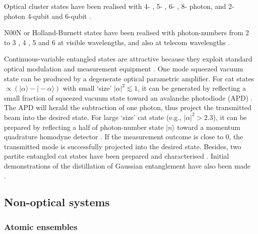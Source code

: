 \documentclass[aps, rmp, twocolumn, amsmath, amssymb, nofootinbib, superscriptaddress, longbibliography, floatfix, table-of-contents, eqsecnum]{revtex4-1}
\newcommand{\ket}[1]{|#1\rangle}
\begin{document}
Optical cluster states have been realised with 4- \cite{walther2005experimental}, 5- \cite{lu2008experimental}, 6- \cite{lu2007experimental}, 8- \cite{yao2012experimental} photon, and 2-photon 4-qubit \cite{chen2007experimental} and 6-qubit \cite{ceccarelli2009experimental}.

N00N or Holland-Burnett states have been realised with photon-numbers from 2 \cite{edamatsu2002measurement} to 3 \cite{mitchell2004super}, 4 \cite{walther2004broglie, nagata2007beating, matthews2011heralding}, 5 \cite{afek2010high} and 6 \cite{xiang2012optimal} at visible wavelengths, and also at telecom wavelengths \cite{yabuno2012four, bisht2015spectral, jin2016detection}.

Continuous-variable entangled states are attractive because they exploit standard optical modulation and measurement equipment \cite{ralph2009bright}. One mode squeezed vacuum state can be produced by a degenerate optical parametric amplifier. For cat states \mbox{$\propto(\ket{\alpha} - \ket{-\alpha})$} with small `size' \mbox{$|\alpha|^2 \lesssim 1$}, it can be generated by reflecting a small fraction of squeezed vacuum state toward an avalanche photodiode (APD) \cite{neergaard2006generation, ourjoumtsev2006generating, wakui2007photon}. The APD will herald the subtraction of one photon, thus project the transmitted beam into the desired state. For large `size' cat state (e.g., \mbox{$|\alpha|^2 > 2.3$}), it can be prepared by reflecting a half of photon-number state $\ket{n}$ toward a momentum quadrature homodyne detector \cite{ourjoumtsev2007generation,takahashi2008generation}. If the measurement outcome is close to 0, the transmitted mode is successfully projected into the desired state. Besides, two partite entangled cat states have been prepared and characterised \cite{ourjoumtsev2009preparation}. Initial demonstrations of the distillation of Gaussian entanglement have also been made \cite{takahashi2010entanglement, xiang2010heralded}.

%
%

\subsection{Non-optical systems} 

%
%

\subsubsection{Atomic ensembles} 
\end{document}
